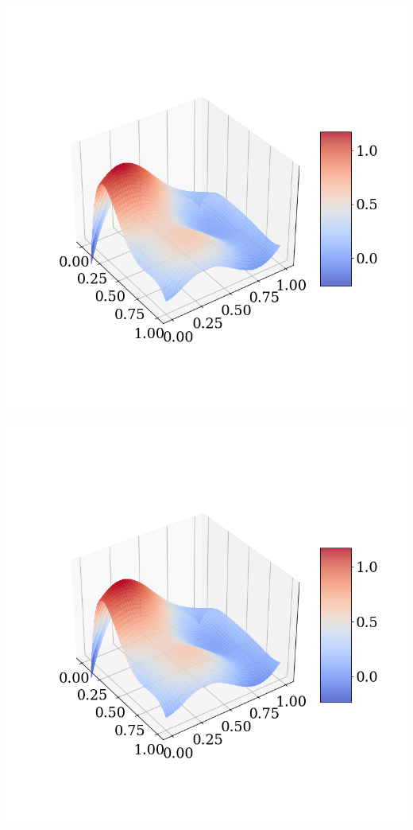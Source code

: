 \documentclass[twoside,11pt]{report}
\begin{document}
\begin{minipage}[!t]{.48\linewidth}
    \begin{center}
        \includegraphics[width=1.0\textwidth]{../runsAndAdditions/predictionOLS.png}
\end{center}
\end{minipage}
\hspace{4mm}
\begin{minipage}[!t]{.48\linewidth}
    \begin{center}
        \includegraphics[width=1.0\textwidth]{../runsAndAdditions/predictionRidge.png}
    \end{center}
\end{minipage}
\end{document}
